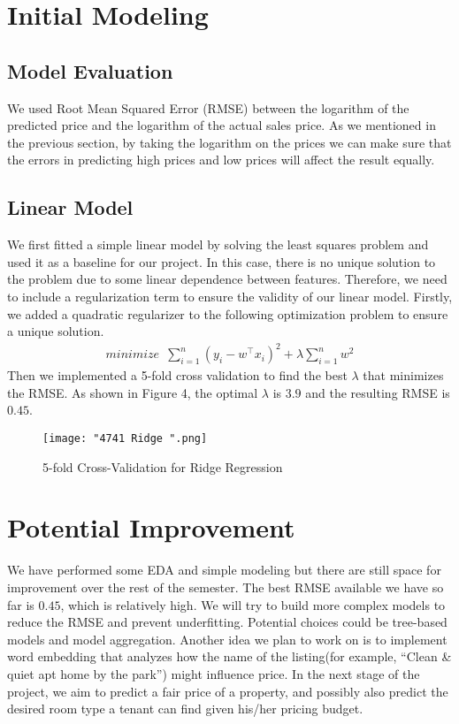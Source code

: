 \documentclass[twocolumn]{article}
\begin{document}
\section{Initial Modeling}
\subsection{Model Evaluation}
We used Root Mean Squared Error (RMSE) between the logarithm of the predicted price and the logarithm of the actual sales price. As we mentioned in the previous section, by taking the logarithm on the prices we can make sure that the errors in predicting high prices and low prices will affect the result equally.

\subsection{Linear Model}
We first fitted a simple linear model by solving the least squares problem and used it as a baseline for our project. In this case, there is no unique solution to the problem due to some linear dependence between features. Therefore, we need to include a regularization term to ensure the validity of our linear model. Firstly, we added a quadratic regularizer to the following optimization problem to ensure a unique solution.
\begin{align}  
    \displaystyle{minimize \enspace \sum\limits_{i=1}^{n}(y_i - w^\intercal x_i)^2 + \lambda \sum\limits_{i=1}^{n} w^2}
\end{align}
Then we implemented a 5-fold cross validation to find the best $\lambda$ that minimizes the RMSE. As shown in Figure 4, the optimal $\lambda$ is $3.9$ and the resulting RMSE is $0.45$.

\begin{figure}[h]
    \centering
    \texttt{[image: "4741 Ridge ".png]}
    \caption{5-fold Cross-Validation for Ridge Regression}
\end{figure}

\section{Potential Improvement}
We have performed some EDA and simple modeling but there are still space for improvement over the rest of the semester. The best RMSE available we have so far is $0.45$, which is relatively high. We will try to build more complex models to reduce the RMSE and prevent underfitting. Potential choices could be tree-based models and model aggregation. Another idea we plan to work on is to implement word embedding that analyzes how the name of the listing(for example, “Clean \& quiet apt home by the park”) might influence price. In the next stage of the project, we aim to predict a fair price of a property, and possibly also predict the desired room type a tenant can find given his/her pricing budget. 
\end{document}
